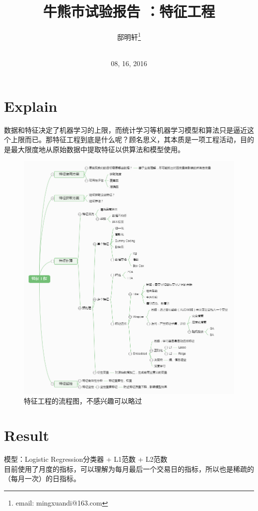 \documentclass[10pt,a4paper]{article}
\author{邸明轩\footnote{email: mingxuandi@163.com}\\[2ex]
	\\[2ex]}
\title{牛熊市试验报告 \uppercase\expandafter{\romannumeral3}：特征工程}
\date{08, 16, 2016}
\begin{document}
	
	\makeatletter
	\let\@afterindentfalse\@afterindenttrue
	\@afterindenttrue
	\makeatother
	\setlength{\parindent}{2em}  %
	
	\maketitle
	
	\section{Explain }
	数据和特征决定了机器学习的上限，而统计学习等机器学习模型和算法只是逼近这个上限而已。那特征工程到底是什么呢？顾名思义，其本质是一项工程活动，目的是最大限度地从原始数据中提取特征以供算法和模型使用。
	\begin{figure}[t]
		\centering
		\includegraphics[width=0.9\linewidth]{特征工程说明.jpg}
		\caption{特征工程的流程图，不感兴趣可以略过}
		\label{fig1}
	\end{figure}
	\section{Result }
\noindent 模型：Logistic Regression分类器 + L1范数 + L2范数\\
目前使用了月度的指标，可以理解为每月最后一个交易日的指标，所以也是稀疏的（每月一次）的日指标。\\
\end{document}
